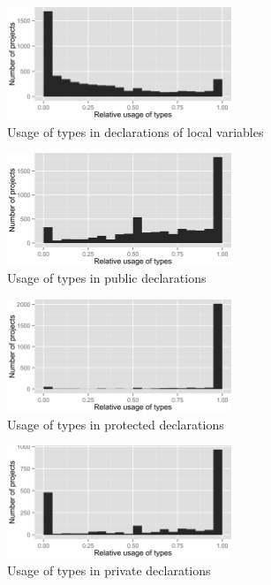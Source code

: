 \begin{figure}[h]
\centering 
\includegraphics[width=0.6\textwidth]{../aosd_2014/analysis/result/script/class/histograms/6_Local_Variable.png} 
\caption{Usage of types in declarations of local variables}
\end{figure}

\begin{figure}[h]
\centering 
\includegraphics[width=0.6\textwidth]{../aosd_2014/analysis/result/script/class/histograms/13_Public.png} 
\caption{Usage of types in public declarations}
\end{figure}

\begin{figure}[h]
\centering 
\includegraphics[width=0.6\textwidth]{../aosd_2014/analysis/result/script/class/histograms/12_Protected.png} 
\caption{Usage of types in protected declarations}
\end{figure}

\begin{figure}[h]
\centering 
\includegraphics[width=0.6\textwidth]{../aosd_2014/analysis/result/script/class/histograms/11_Private.png} 
\caption{Usage of types in private declarations}
\end{figure}

